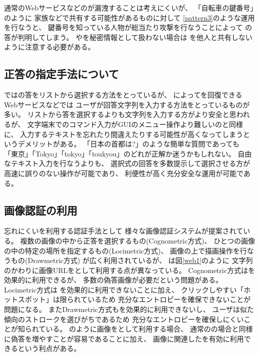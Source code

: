 \documentclass[twoside]{wiss}
\begin{document}
通常のWebサービスなどの{\PW}が漏洩することは考えにくいが、
「自転車の鍵番号」のように
家族などで共有する可能性があるものに対して
\ref{pattern3}のような運用を行なうと、
鍵番号を知っている人物が総当たり攻撃を行なうことによって
{\SQ}の答が判明してしまう。
{\SS}や{\SQ}を秘密情報として扱わない場合は
{\PW}を他人と共有しないように注意する必要がある。

\subsection{正答の指定手法について}

{\EP}では{\SQ}の答をリストから選択する方法をとっているが、
{\SQ}によって{\PW}を回復できるWebサービスなどでは
ユーザが回答文字列を入力する方法をとっているものが多い。
リストから答を選択するよりも文字列を入力する方がより安全と思われるが、
文字端末でのコマンド入力がGUIのメニュー操作より難しいのと同様に、
入力するテキストを忘れたり間違えたりする可能性が高くなってしまうというデメリットがある。
「日本の首都は?」のような簡単な質問であっても
「東京」「Tokyo」「tokyo」「toukyou」のどれが正解か迷うかもしれない。
自由なテキスト入力を行なうよりも、
選択式の回答を多数提示して選択させる方が高速に誤りのない操作が可能であり、
利便性が高く充分安全な運用が可能である。

% 
% 
% 
% 
% 

\subsection{画像認証の利用}

忘れにくい{\EM}を利用する認証手法として
様々な画像認証システム\cite{Biddle:2012:GPL:2333112.2333114}\cite{GraphicalPasswords}\cite{小池英樹:2006-05-15}が提案されている。
複数の画像の中から正答を選択するもの(Cognometric方式)、
ひとつの画像の中の特定の場所を指定するもの(Locimetric方式)、
画像の上で描画操作を行なうもの(Drawmetric方式)
が広く利用されているが\cite{Biddle:2012:GPL:2333112.2333114}\cite{GraphicalPasswords}\cite{Guideline}、
{\EP}は図\ref{web1}のように
文字列のかわりに画像URLを{\SQ}として利用する点が異なっている。
%
Cognometric方式は{\EM}を効果的に利用できるが、
多数の偽答画像が必要だという問題がある。
Locimetric方式は
{\EM}を効果的に利用できないことに加え、
クリックしやすい「ホットスポット」は限られているため
充分なエントロピーを確保できないことが問題になる\cite{Dirik:2007:MUC:1280680.1280684}。
またDrawmetric方式も{\EM}を効果的に利用できないし、
ユーザは似た傾向のストロークを選びがちであるため
充分なエントロピーを確保しにくいことが知られている\cite{Nali}。
%
{\EP}のように画像を{\SQ}として利用する場合、
通常の{\SQ}の場合と同様に偽答を増やすことが容易であることに加え、
画像に関連した{\EM}を有効に利用できるという利点がある\cite{増井:CSS}。
\end{document}
